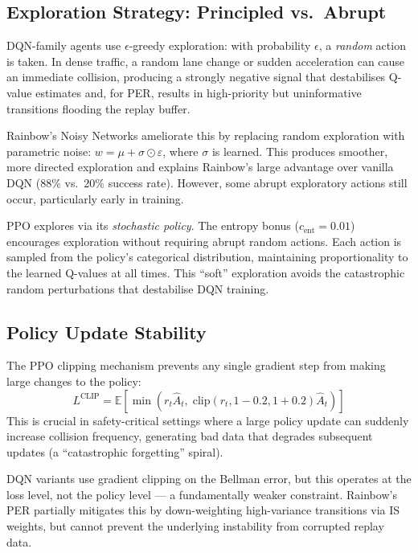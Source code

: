 \documentclass[conference]{IEEEtran}
\begin{document}
\subsection{Exploration Strategy: Principled vs.\ Abrupt}

DQN-family agents use $\epsilon$-greedy exploration: with probability $\epsilon$, a
\emph{random} action is taken. In dense traffic, a random lane change or sudden
acceleration can cause an immediate collision, producing a strongly negative signal
that destabilises Q-value estimates and, for PER, results in high-priority but
uninformative transitions flooding the replay buffer.

Rainbow's Noisy Networks ameliorate this by replacing random exploration with
parametric noise: $w = \mu + \sigma \odot \varepsilon$, where $\sigma$ is learned.
This produces smoother, more directed exploration and explains Rainbow's large advantage
over vanilla DQN (88\% vs.\ 20\% success rate). However, some abrupt exploratory
actions still occur, particularly early in training.

PPO explores via its \emph{stochastic policy}. The entropy bonus ($c_{\text{ent}}{=}0.01$)
encourages exploration without requiring abrupt random actions. Each action is sampled
from the policy's categorical distribution, maintaining proportionality to the learned
Q-values at all times. This ``soft'' exploration avoids the catastrophic random
perturbations that destabilise DQN training.

\subsection{Policy Update Stability}

The PPO clipping mechanism prevents any single gradient step from making large
changes to the policy:
\[
  L^{\text{CLIP}} = \mathbb{E}\left[\min\left(r_t \hat{A}_t,\;
  \text{clip}(r_t, 1{-}0.2, 1{+}0.2)\hat{A}_t\right)\right]
\]
This is crucial in safety-critical settings where a large policy update can suddenly
increase collision frequency, generating bad data that degrades subsequent updates
(a ``catastrophic forgetting'' spiral).

DQN variants use gradient clipping on the Bellman error, but this operates at the
loss level, not the policy level — a fundamentally weaker constraint. Rainbow's PER
partially mitigates this by down-weighting high-variance transitions via IS weights,
but cannot prevent the underlying instability from corrupted replay data.
\end{document}
